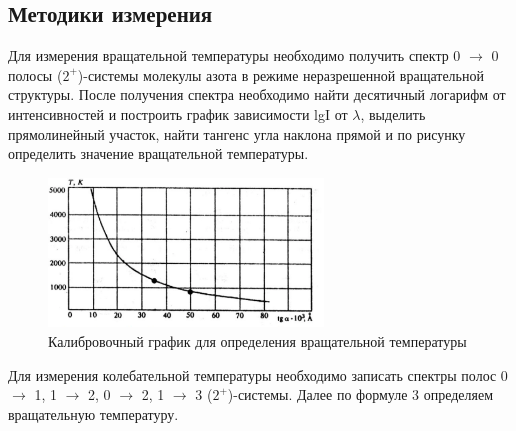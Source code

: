 \subsection{Методики измерения}
Для измерения вращательной температуры необходимо получить спектр 0 $\rightarrow $ 0 полосы ($2^+$)-системы молекулы азота в режиме неразрешенной вращательной структуры. После получения спектра необходимо найти десятичный логарифм от интенсивностей и построить график зависимости lgI от $\lambda$, выделить прямолинейный участок, найти тангенс угла наклона прямой и по рисунку  определить значение вращательной температуры.
\begin{figure}[H]
	\begin{center}
		\includegraphics[width=0.65\textwidth]{kalibr.png}
		\caption{Калибровочный график для определения вращательной температуры}
		\label{scheme}
	\end{center}	
\end{figure}
Для измерения колебательной температуры необходимо записать спектры полос 0 $\rightarrow $ 1, 1 $\rightarrow $ 2, 0 $\rightarrow $ 2, 1 $\rightarrow $ 3 ($2^{+}$)-системы. Далее по формуле 3 определяем вращательную температуру.
